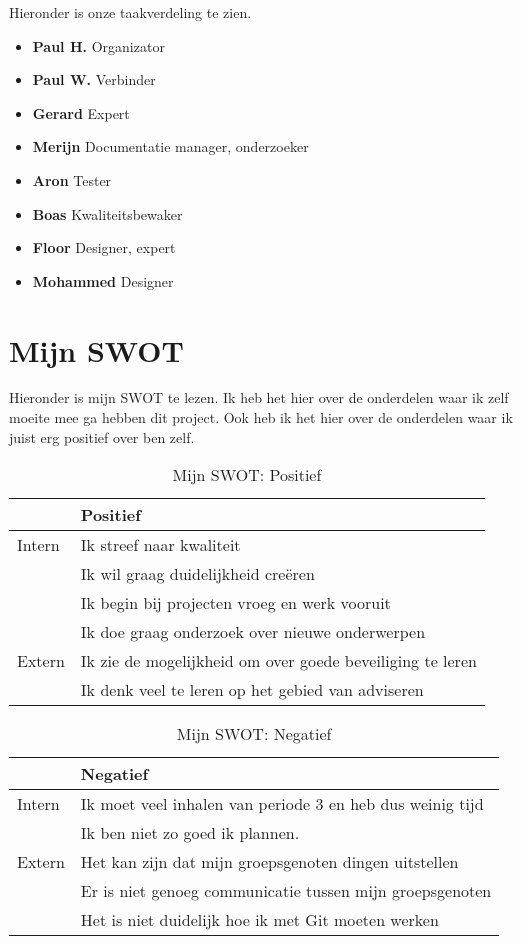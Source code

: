 \documentclass{article}
\begin{document}
Hieronder is onze taakverdeling te zien.

\begin{itemize}
  \item \textbf{Paul H.} Organizator
  \item \textbf{Paul W.} Verbinder 
  \item \textbf{Gerard} Expert 
  \item \textbf{Merijn} Documentatie manager, onderzoeker
  \item \textbf{Aron} Tester
  \item \textbf{Boas} Kwaliteitsbewaker 
  \item \textbf{Floor} Designer, expert
  \item \textbf{Mohammed} Designer
\end{itemize}

\section{Mijn SWOT}

Hieronder is mijn SWOT te lezen.
Ik heb het hier over de onderdelen waar ik zelf moeite mee ga hebben dit project.
Ook heb ik het hier over de onderdelen waar ik juist erg positief over ben zelf.

\begin{table}[h!]
\caption{Mijn SWOT: Positief}
\label{tab: Mijn SWOT: Positief}
\begin{tabular}{l|l}
        & \textbf{Positief} \\
        \hline
        {Intern} 	& Ik streef naar kwaliteit \\ 
			& Ik wil graag duidelijkheid cre\"eren \\
			& Ik begin bij projecten vroeg en werk vooruit \\
			& Ik doe graag onderzoek over nieuwe onderwerpen \\
        {Extern}	& Ik zie de mogelijkheid om over goede beveiliging te leren \\ 
			& Ik denk veel te leren op het gebied van adviseren \\
\end{tabular}
\end{table}

\begin{table}[h!]
\caption{Mijn SWOT: Negatief}
\label{tab: Mijn SWOT: Negatief}
\begin{tabular}{l|l}
        & \textbf{Negatief} \\
        \hline
        {Intern} 	& Ik moet veel inhalen van periode 3 en heb dus weinig tijd \\ 
			& Ik ben niet zo goed ik plannen. \\
        {Extern}	& Het kan zijn dat mijn groepsgenoten dingen uitstellen \\ 
			& Er is niet genoeg communicatie tussen mijn groepsgenoten \\
			& Het is niet duidelijk hoe ik met Git moeten werken \\
\end{tabular}
\end{table}
\end{document}
